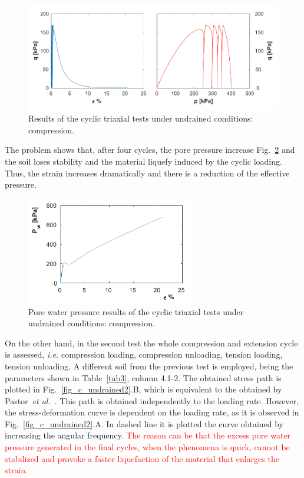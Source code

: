 \documentclass[preprint,12pt,a4paper]{elsarticle}
\begin{document}
\begin{figure}
\centering
\includegraphics[width=1.05\textwidth]{Figs/ciclo_undrained_1.pdf}
\caption{Results of the cyclic triaxial tests under undrained conditions: compression.}
\label{fig_c_undrained1}
\end{figure}

The problem shows that, after four cycles, the pore pressure increase Fig.~\ref{fig_c_undrainedpw} and the soil loses stability and the material liquefy induced by the cyclic loading. Thus, the strain increases dramatically and there is a reduction of the effective pressure. 

\begin{figure}
\centering
\includegraphics[width=0.65\textwidth]{Figs/ciclo_undrained_pw.pdf}
\caption{Pore water pressure results of the cyclic triaxial tests under undrained conditions: compression.}
\label{fig_c_undrainedpw}
\end{figure}


On the other hand, in the second test the whole compression and extension cycle is assessed, \textit{i.e.} compression loading, compression unloading, tension loading, tension unloading. A different soil from the previous test is employed, being the parameters shown in Table~\ref{tab3}, column 4.1-2. The obtained stress path  is plotted in Fig.~\ref{fig_c_undrained2}.B, which is equivalent to the obtained by Pastor~\textit{et al.}~\cite{PastorZC:90}.  This path is obtained independently to the loading rate. However, the stress-deformation curve is dependent on the loading rate, as it is observed in Fig.~\ref{fig_c_undrained2}.A. In dashed line it is plotted the curve obtained by increasing the angular frequency. \textcolor{red}{The reason can be that the excess pore water pressure generated in the final cycles,  when the phenomena is quick, cannot be stabilized and provoke a faster liquefaction of the material that enlarges the strain.}
\end{document}
